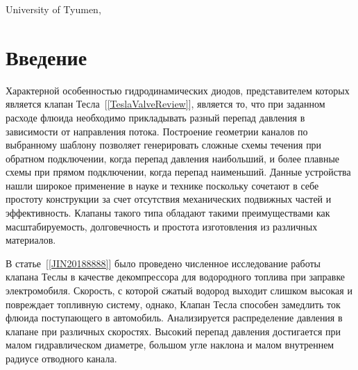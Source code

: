 \documentclass[10pt,a4paper]{book}
\begin{document}
    
    {University of Tyumen, \break
        }
    
    
    \MakeArticleHeader
    
    \section{Введение}\label{p:vved}
    Характерной особенностью гидродинамических диодов, представителем которых является клапан Тесла~[\ref{TeslaValveReview}], является то, что при заданном расходе флюида необходимо прикладывать разный перепад давления в зависимости от направления потока. Построение геометрии каналов по выбранному шаблону позволяет генерировать сложные схемы течения при обратном подключении, когда перепад давления наибольший, и более плавные схемы при прямом подключении, когда перепад наименьший. Данные устройства нашли широкое применение в науке и технике поскольку сочетают в себе простоту конструкции за счет отсутствия механических подвижных частей и эффективность. Клапаны такого типа обладают такими преимуществами как масштабируемость, долговечность и простота изготовления из различных материалов.
    
    В статье~[\ref{JIN20188888}] было проведено численное исследование работы клапана Теслы в качестве декомпрессора для водородного топлива при заправке электромобиля. Скорость, с которой сжатый водород выходит слишком высокая и повреждает топливную систему, однако, Клапан Тесла способен замедлить ток флюида поступающего в автомобиль. Анализируется распределение давления в клапане при различных скоростях. Высокий перепад давления достигается при малом гидравлическом диаметре, большом угле наклона и малом внутреннем радиусе отводного канала. 
    
\end{document}
